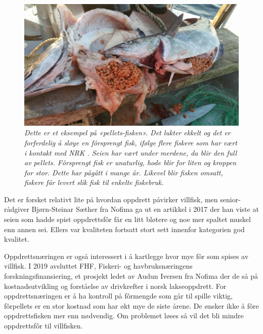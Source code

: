 \begin{figure} 
\begin{center} 
\includegraphics[scale=0.2]{figures/oppdrettfor}
\caption{\small \sl Dette er et eksempel på «pellets-fisken». Det lukter ekkelt og det er forferdelig å sløye en fôrsprengt fisk, ifølge flere fiskere som har vært i kontakt med NRK \cite{Trana m.fl. 2019}. Seien har vært under merdene, da blir den full av pellets. Fôrsprengt fisk er unaturlig, hode blir for liten og kroppen for stor. Dette har pågått i mange år. Likevel blir fisken omsatt, fiskere får levert slik fisk til enkelte fiskebruk. \cite{Angell og Ekanger 2017} \label{fig:oppdrettfor}} 
\end{center} 
\end{figure} 

Det er forsket relativt lite på hvordan oppdrett påvirker villfisk, men senior-rådgiver Bjørn-Steinar Sæther fra Nofima ga ut en artikkel i 2017 der han viste at seien som hadde spist oppdrettsfôr får en litt bløtere og noe mer spaltet muskel enn annen sei. Ellers var kvaliteten fortsatt stort sett innenfor kategorien god kvalitet. \cite{Saether 2017}


Oppdrettsnæringen er også interessert i å kartlegge hvor mye fôr som spises av villfisk. I 2019 avsluttet FHF, Fiskeri- og havbruksnæringens forskningsfinansiering, et prosjekt ledet av Audun Iversen fra Nofima der de så på kostnadsutvikling og forståelse av drivkrefter i norsk lakseoppdrett. For oppdrettsnæringen er å ha kontroll på fôrmengde som går til spille viktig, fôrpellets er en stor kostnad som har økt mye de siste årene. De ønsker ikke å fôre oppdrettsfisken mer enn nødvendig. Om problemet løses så vil det bli mindre oppdrettsfôr til villfisken. \cite{Baevre-Jensen 2019}

